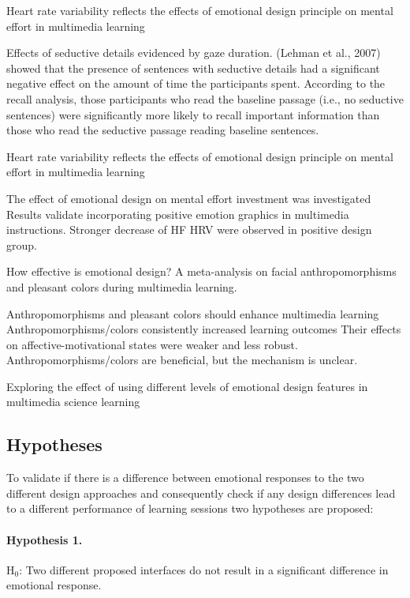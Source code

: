 		\cite{Le2018} Heart rate variability reflects the effects of emotional design principle on mental effort in multimedia learning
		
		\cite{Plass2016}
		
		\cite{Chang2014} Effects of seductive details evidenced by gaze duration.
		(Lehman et al., 2007) showed that the presence of sentences with seductive details had a significant
		negative effect on the amount of time the participants spent. According to the recall analysis, those
		participants who read the baseline passage (i.e., no seductive
		sentences) were significantly more likely to recall important information than those who read the seductive passage
		reading baseline sentences.
		
		\cite{Le2018} Heart rate variability reflects the effects of emotional design principle on mental effort in multimedia learning
		
		The effect of emotional design on mental effort investment was investigated
		Results validate incorporating positive emotion graphics in multimedia instructions.
		Stronger decrease of HF HRV were observed in positive design group.
		
		\cite{Brom2018} How effective is emotional design? A meta-analysis on facial anthropomorphisms and pleasant colors during multimedia learning.
		
		Anthropomorphisms and pleasant colors should enhance multimedia learning
		Anthropomorphisms/colors consistently increased learning outcomes
		Their effects on affective-motivational states were weaker and less robust.
		Anthropomorphisms/colors are beneficial, but the mechanism is unclear.
		\cite{Lee2014}
		
		\cite{Uzun2018} Exploring the effect of using different levels of emotional design features in multimedia science learning
		
		
	
	\subsection{Hypotheses}
	
		To validate if there is a difference between emotional responses to the two different design approaches and consequently check if any design differences lead to a different performance of learning sessions two hypotheses are proposed:
	
		\paragraph{Hypothesis 1.} H$_{0}$: Two different proposed interfaces do not result in a significant difference in emotional response.
		

